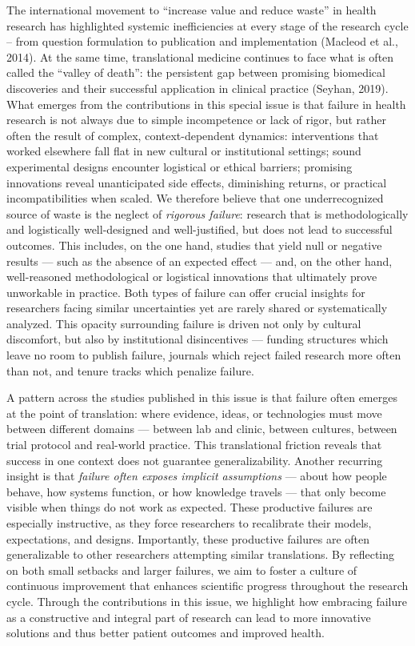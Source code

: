 \documentclass[authordate, empirical]{jote-new-article}
\begin{document}
	The international movement to “increase value and reduce waste” in health research has highlighted systemic inefficiencies at every stage of the research cycle -- from question formulation to publication and implementation (Macleod et al., 2014). At the same time, translational medicine continues to face what is often called the “valley of death”: the persistent gap between promising biomedical discoveries and their successful application in clinical practice (Seyhan, 2019). What emerges from the contributions in this special issue is that failure in health research is not always due to simple incompetence or lack of rigor, but rather often the result of complex, context-dependent dynamics: interventions that worked elsewhere fall flat in new cultural or institutional settings; sound experimental designs encounter logistical or ethical barriers; promising innovations reveal unanticipated side effects, diminishing returns, or practical incompatibilities when scaled. We therefore believe that one underrecognized source of waste is the neglect of \emph{rigorous failure}: research that is methodologically and logistically well-designed and well-justified, but does not lead to successful outcomes. This includes, on the one hand, studies that yield null or negative results — such as the absence of an expected effect — and, on the other hand, well-reasoned methodological or logistical innovations that ultimately prove unworkable in practice. Both types of failure can offer crucial insights for researchers facing similar uncertainties yet are rarely shared or systematically analyzed. This opacity surrounding failure is driven not only by cultural discomfort, but also by institutional disincentives — funding structures which leave no room to publish failure, journals which reject failed research more often than not, and tenure tracks which penalize failure.



	A pattern across the studies published in this issue is that failure often emerges at the point of translation: where evidence, ideas, or technologies must move between different domains — between lab and clinic, between cultures, between trial protocol and real-world practice. This translational friction reveals that success in one context does not guarantee generalizability. Another recurring insight is that \emph{failure often exposes implicit assumptions} — about how people behave, how systems function, or how knowledge travels — that only become visible when things do not work as expected. These productive failures are especially instructive, as they force researchers to recalibrate their models, expectations, and designs. Importantly, these productive failures are often generalizable to other researchers attempting similar translations. By reflecting on both small setbacks and larger failures, we aim to foster a culture of continuous improvement that enhances scientific progress throughout the research cycle. Through the contributions in this issue, we highlight how embracing failure as a constructive and integral part of research can lead to more innovative solutions and thus better patient outcomes and improved health.
\end{document}
